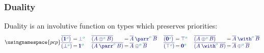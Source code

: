 \subsubsection*{Duality}
\label{sec:pcp-duality}
Duality is an involutive function on types which preserves priorities:
\[
  \usingnamespace{pcp}
  \setlength{\arraycolsep}{1pt}
  \begin{array}{lcl}
    \ty{\co{(\tyone[\cs{o}])}} & = & \ty{\tybot[\cs{o}]} \\
    \ty{\co{(\tybot[\cs{o}])}} & = & \ty{\tyone[\cs{o}]}
  \end{array}
  \quad
  \begin{array}{lcl}
    \ty{\co{(\tytens[\cs{o}]{A}{B})}} & = & \ty{\typarr[\cs{o}]{\co{A}}{\co{B}}} \\
    \ty{\co{(\typarr[\cs{o}]{A}{B})}} & = & \ty{\tytens[\cs{o}]{\co{A}}{\co{B}}}
  \end{array}
  \quad
  \begin{array}{lcl}
    \ty{\co{(\tynil[\cs{o}])}} & = & \ty{\tytop[\cs{o}]} \\
    \ty{\co{(\tytop[\cs{o}])}} & = & \ty{\tynil[\cs{o}]}
  \end{array}
  \quad
  \begin{array}{lcl}
    \ty{\co{(\typlus[\cs{o}]{A}{B})}} & = & \ty{\tywith[\cs{o}]{\co{A}}{\co{B}}} \\
    \ty{\co{(\tywith[\cs{o}]{A}{B})}} & = & \ty{\typlus[\cs{o}]{\co{A}}{\co{B}}}
  \end{array}
\]

